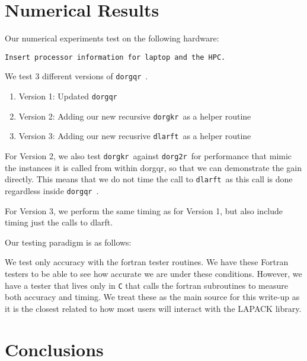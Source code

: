 \documentclass[review]{siamart220329}
\newcommand{\dorgqr}{\texttt{dorgqr}\ }
\newcommand{\dorg}{\texttt{dorg2r}\ }
\newcommand{\dorgkr}{\texttt{dorgkr}\ }
\newcommand{\dlarft}{\texttt{dlarft}\ }
\begin{document}
\section{Numerical Results}\label{sec:num}
Our numerical experiments test on the following hardware:
\begin{verbatim}
Insert processor information for laptop and the HPC. 
\end{verbatim}
We test 3 different versions of \dorgqr. 
\begin{enumerate}
    \item[] Version 1: Updated \dorgqr
    \item[] Version 2: Adding our new recursive \dorgkr as a helper routine
    \item[] Version 3: Adding our new recusrive \dlarft as a helper routine
\end{enumerate}
For Version 2, we also test \dorgkr against \dorg for performance that mimic the instances it is called from within dorgqr, so
that we can demonstrate the gain directly. This means that we do not time the call to \dlarft as this call is done regardless
inside \dorgqr. 

For Version 3, we perform the same timing as for Version 1, but also include timing just the calls to dlarft.

Our testing paradigm is as follows: 

We test only accuracy with the fortran tester routines. We have these Fortran testers to be able to see how accurate we are
under these conditions. However, we have a tester that lives only in \verb|C| that calls the fortran subroutines to measure
both accuracy and timing. We treat these as the main source for this write-up as it is the closest related to how most users
will interact with the LAPACK library. 

\section{Conclusions}\label{sec:conc}



\end{document}
